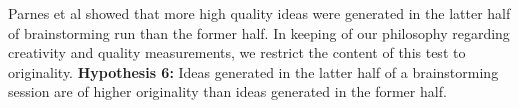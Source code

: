 Parnes et al \cite{parnes_effects_1961} showed that more high quality ideas were generated in the latter half of brainstorming run than the former half. In keeping of our philosophy regarding creativity and quality measurements, we restrict the content of this test to originality. \textbf{Hypothesis 6:} Ideas generated in the latter half of a brainstorming session are of higher originality than ideas generated in the former half.


